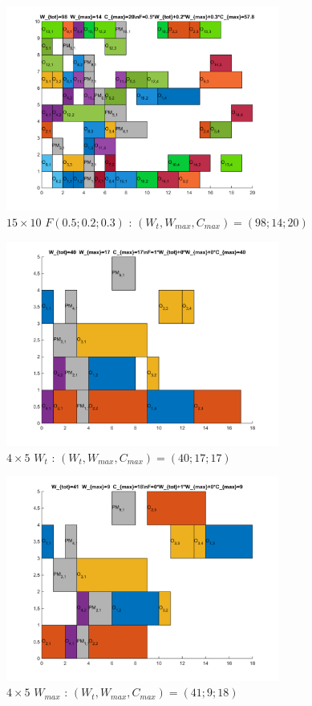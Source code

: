 \documentclass[10pt,a4paper]{scrartcl}
\begin{document}
\begin{figure}
  \centering
  \includegraphics[width=0.8\textwidth]{img/results15x10_F050203.png}
  \caption{$15 \times 10$ $F(0.5;0.2;0.3)$ : $(W_t, W_{max}, C_{max}) = (98; 14; 20)$}
\end{figure}
\begin{figure}
  \centering
  \includegraphics[width=0.8\textwidth]{img/results4x5_Wtot.png}
  \caption{$4 \times 5$ $W_{t}$ : $(W_t, W_{max}, C_{max}) = (40; 17; 17)$}
\end{figure}
\begin{figure}
  \centering
  \includegraphics[width=0.8\textwidth]{img/results4x5_Wmax.png}
  \caption{$4 \times 5$ $W_{max}$ : $(W_t, W_{max}, C_{max}) = (41; 9; 18)$}
\end{figure}
\end{document}
